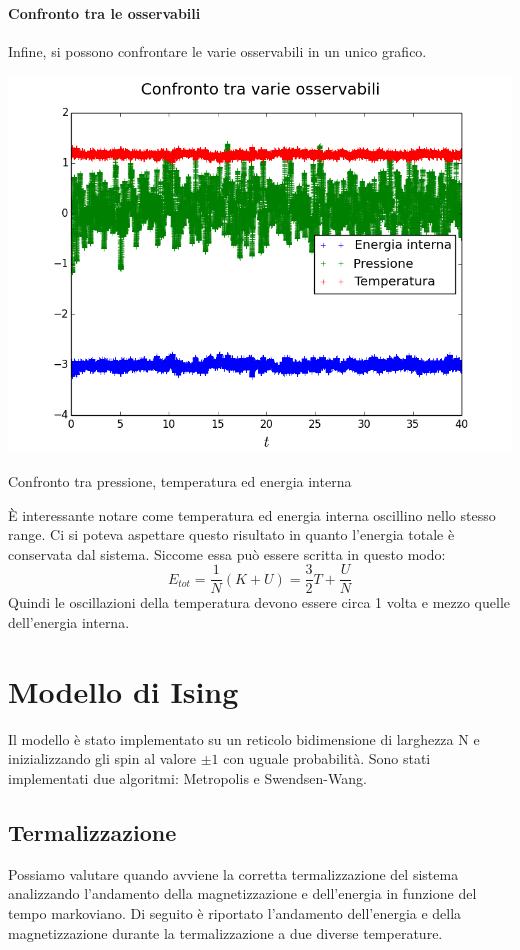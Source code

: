 \subsubsection{Confronto tra le osservabili}
Infine, si possono confrontare le varie osservabili in un unico grafico.
\begin{myfig}
\includegraphics[scale=0.55]{soft_core/10_cfr.png}
\caption{Confronto tra pressione, temperatura ed energia interna}
\end{myfig}
È interessante notare come temperatura ed energia interna oscillino nello stesso range.
Ci si poteva aspettare questo risultato in quanto l'energia totale è conservata dal sistema.
Siccome essa può essere scritta in questo modo:
$$
	E_{tot} = \frac{1}{N} (K + U) = \frac{3}{2} T+ \frac{U}{N} 
$$
Quindi le oscillazioni della temperatura devono essere circa 1 volta e mezzo quelle dell'energia interna.





\chapter{Modello di Ising}
Il modello è stato implementato su un reticolo bidimensione di larghezza N e inizializzando gli spin al valore $\pm 1 $  con uguale probabilità.
Sono stati implementati due algoritmi: Metropolis e Swendsen-Wang.\\

\section{Termalizzazione}
Possiamo valutare quando avviene la corretta termalizzazione del sistema analizzando l'andamento della magnetizzazione e dell'energia in funzione del tempo markoviano.
Di seguito è riportato l'andamento dell'energia e della magnetizzazione durante la termalizzazione a due diverse temperature.
